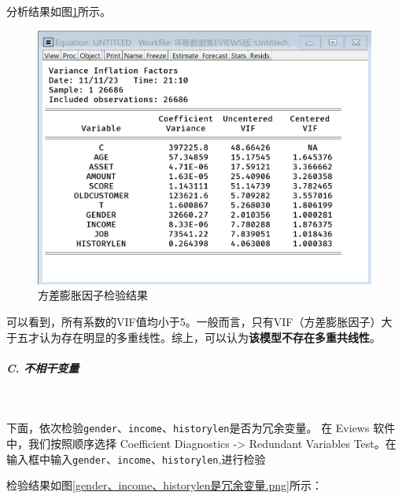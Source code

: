 \documentclass[13.5pt,hyperref,a4paper,UTF8]{ctexart}
\begin{document}
分析结果如图\ref{方差膨胀因子检验结果}所示。

\begin{figure}[H]
    \centering
    \includegraphics[width=1\linewidth]{figures//3回归//回归2/VIF结果.png}
    \caption{方差膨胀因子检验结果}
    \label{方差膨胀因子检验结果}
\end{figure}

可以看到，所有系数的VIF值均小于5。一般而言，只有VIF（方差膨胀因子）大于五才认为存在明显的多重线性。综上，可以认为\textbf{该模型不存在多重共线性}。

\subparagraph {C. 不相干变量}
\

下面，依次检验\texttt{gender}、\texttt{income}、\texttt{historylen}是否为冗余变量。
在 Eviews 软件中，我们按照顺序选择 Coefficient Diagnostics -> Redundant Variables Test。在输入框中输入\texttt{gender}、\texttt{income}、\texttt{historylen},进行检验

检验结果如图\ref{gender、income、historylen是冗余变量.png}所示：
\end{document}
